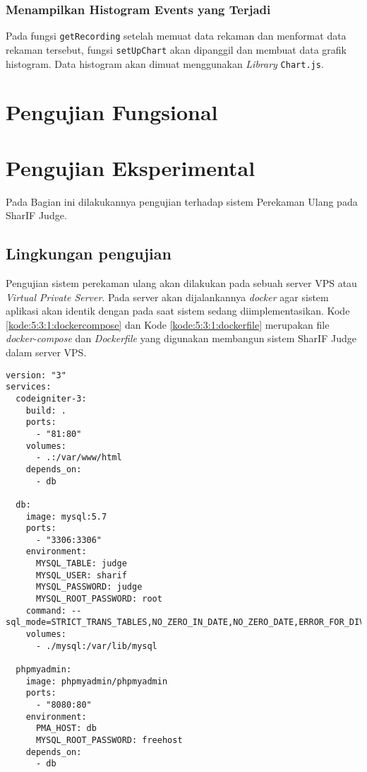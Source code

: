 \subsubsection{Menampilkan Histogram Events yang Terjadi}

Pada fungsi \verb|getRecording| setelah memuat data rekaman dan menformat data rekaman tersebut, fungsi \verb|setUpChart| akan dipanggil dan membuat data grafik histogram. Data histogram akan dimuat menggunakan \textit{Library} \verb|Chart.js|.


\section{Pengujian Fungsional}
\label{sec:5:fungsional}

\section{Pengujian Eksperimental}
\label{sec:5:eksperimental}

Pada Bagian ini dilakukannya pengujian terhadap sistem Perekaman Ulang pada SharIF Judge.

\subsection{Lingkungan pengujian}
Pengujian sistem perekaman ulang akan dilakukan pada sebuah server VPS atau \textit{Virtual Private Server}. Pada server akan dijalankannya \textit{docker} agar sistem aplikasi akan identik dengan pada saat sistem sedang diimplementasikan. Kode \ref{kode:5:3:1:dockercompose} dan Kode \ref{kode:5:3:1:dockerfile} merupakan file \textit{docker-compose} dan \textit{Dockerfile} yang digunakan membangun sistem SharIF Judge dalam server VPS.

\begin{lstlisting}[caption=File \textit{docker-compose} yang digunakan, label=kode:5:3:1:dockercompose]
version: "3"
services:
  codeigniter-3:
    build: .
    ports:
      - "81:80"
    volumes:
      - .:/var/www/html
    depends_on:
      - db

  db:
    image: mysql:5.7
    ports:
      - "3306:3306"
    environment:
      MYSQL_TABLE: judge
      MYSQL_USER: sharif
      MYSQL_PASSWORD: judge
      MYSQL_ROOT_PASSWORD: root
    command: --sql_mode=STRICT_TRANS_TABLES,NO_ZERO_IN_DATE,NO_ZERO_DATE,ERROR_FOR_DIVISION_BY_ZERO,NO_ENGINE_SUBSTITUTION
    volumes:
      - ./mysql:/var/lib/mysql

  phpmyadmin:
    image: phpmyadmin/phpmyadmin
    ports:
      - "8080:80"
    environment:
      PMA_HOST: db
      MYSQL_ROOT_PASSWORD: freehost
    depends_on:
      - db
\end{lstlisting}

